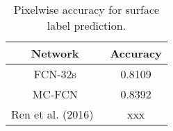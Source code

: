 \begin{table}
	\centering
	\caption{Pixelwise accuracy for surface label prediction.}
	\label{table:ablation}
	\begin{tabular}{c|c}
		\hline
		Network & Accuracy\\
		\hline
		FCN-32s & 0.8109 \\ 
		MC-FCN  & 0.8392 \\
		Ren et al. (2016)~\cite{ren2016three} & xxx \\
		\hline
	\end{tabular}
	
\end{table}


